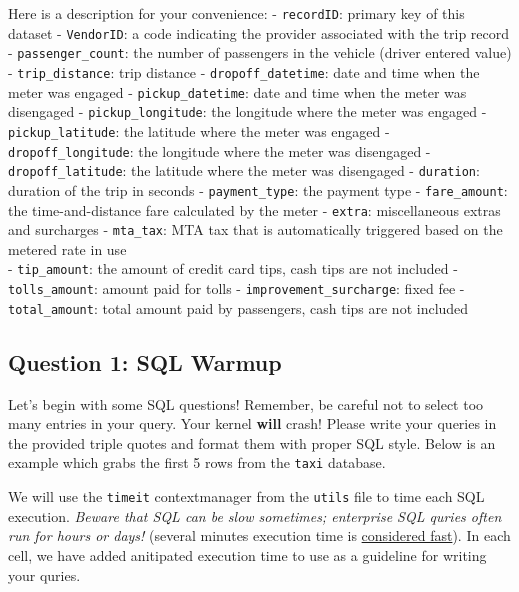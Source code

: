 \documentclass[11pt]{article}
\begin{document}
Here is a description for your convenience: - \texttt{recordID}: primary
key of this dataset - \texttt{VendorID}: a code indicating the provider
associated with the trip record - \texttt{passenger\_count}: the number
of passengers in the vehicle (driver entered value) -
\texttt{trip\_distance}: trip distance - \texttt{dropoff\_datetime}:
date and time when the meter was engaged - \texttt{pickup\_datetime}:
date and time when the meter was disengaged -
\texttt{pickup\_longitude}: the longitude where the meter was engaged -
\texttt{pickup\_latitude}: the latitude where the meter was engaged -
\texttt{dropoff\_longitude}: the longitude where the meter was
disengaged - \texttt{dropoff\_latitude}: the latitude where the meter
was disengaged - \texttt{duration}: duration of the trip in seconds -
\texttt{payment\_type}: the payment type - \texttt{fare\_amount}: the
time-and-distance fare calculated by the meter - \texttt{extra}:
miscellaneous extras and surcharges - \texttt{mta\_tax}: MTA tax that is
automatically triggered based on the metered rate in use\\
- \texttt{tip\_amount}: the amount of credit card tips, cash tips are
not included - \texttt{tolls\_amount}: amount paid for tolls -
\texttt{improvement\_surcharge}: fixed fee - \texttt{total\_amount}:
total amount paid by passengers, cash tips are not included

    \subsection{Question 1: SQL Warmup}\label{question-1-sql-warmup}

Let's begin with some SQL questions! Remember, be careful not to select
too many entries in your query. Your kernel \textbf{will} crash! Please
write your queries in the provided triple quotes and format them with
proper SQL style. Below is an example which grabs the first 5 rows from
the \texttt{taxi} database.

We will use the \texttt{timeit} contextmanager from the \texttt{utils}
file to time each SQL execution. \emph{Beware that SQL can be slow
sometimes; enterprise SQL quries often run for hours or days!} (several
minutes execution time is
\href{https://hortonworks.com/blog/benchmarking-apache-hive-13-enterprise-hadoop/}{considered
fast}). In each cell, we have added anitipated execution time to use as
a guideline for writing your quries.
\end{document}
